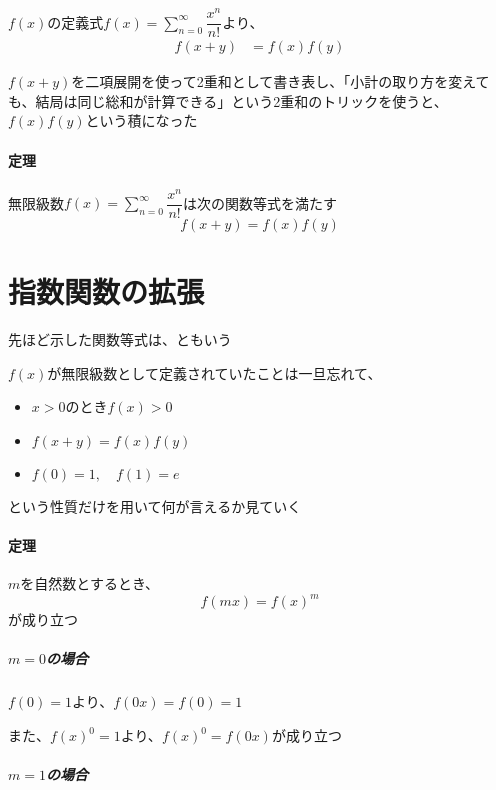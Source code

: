 \documentclass[../book_jiriki_calc]{subfiles}
\begin{document}
$f(x)$の定義式$\displaystyle f(x) = \sum_{n=0}^{\infty} \dfrac{x^n}{n!}$より、
\begin{align}
  f(x+y) & = f(x)f(y)
\end{align}

$f(x+y)$を二項展開を使って2重和として書き表し、「小計の取り方を変えても、結局は同じ総和が計算できる」という2重和のトリックを使うと、$f(x)f(y)$という積になった

\sectionline

\paragraph{定理}

無限級数$\displaystyle f(x) = \sum_{n=0}^{\infty} \dfrac{x^n}{n!}$は次の関数等式を満たす
\begin{equation}
  f(x+y) = f(x)f(y)
\end{equation}

\section{指数関数の拡張}

先ほど示した関数等式は、ともいう

\sectionline

$f(x)$が無限級数として定義されていたことは一旦忘れて、
\begin{itemize}
  \item $x>0$のとき$f(x)>0$
  \item $f(x+y)=f(x)f(y)$
  \item $f(0)=1,\quad f(1) = e$
\end{itemize}
という性質だけを用いて何が言えるか見ていく

\sectionline

\paragraph{定理}

$m$を自然数とするとき、
\begin{equation}
  f(mx) = f(x)^m
\end{equation}
が成り立つ

\br

\subparagraph{$m=0$の場合}

$f(0)=1$より、$f(0x)=f(0)=1$

また、$f(x)^0=1$より、$f(x)^0=f(0x)$が成り立つ

\subparagraph{$m=1$の場合}
\end{document}
